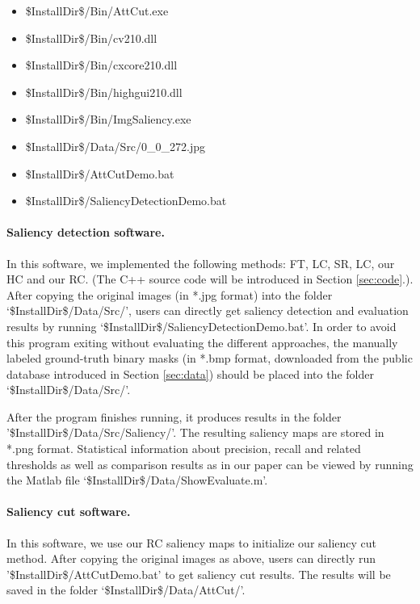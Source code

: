 \documentclass[10pt,twocolumn,letterpaper]{article}
\newcommand{\secref}[1]{Section \ref{#1}}
\newcommand{\SR}{SR\cite{07cvpr/hou_SpectralResidual}}
\newcommand{\FT}{FT\cite{09cvpr/Achanta_FTSaliency}}
\newcommand{\LC}{LC\cite{06acmmm/ZhaiS_spatiotemporal}}
\begin{document}
\begin{itemize}
  \item \$InstallDir\$/Bin/AttCut.exe
  \item \$InstallDir\$/Bin/cv210.dll
  \item \$InstallDir\$/Bin/cxcore210.dll
  \item \$InstallDir\$/Bin/highgui210.dll
  \item \$InstallDir\$/Bin/ImgSaliency.exe
  \item \$InstallDir\$/Data/Src/0\_0\_272.jpg
  \item \$InstallDir\$/AttCutDemo.bat
  \item \$InstallDir\$/SaliencyDetectionDemo.bat
\end{itemize}

\paragraph{Saliency detection software.} In this software,
we implemented the following methods: \FT, \LC, \SR, \LC, our HC and our RC.
(The C++ source code will be introduced in \secref{sec:code}.). After copying the original images (in *.jpg format) into the folder `\$InstallDir\$/Data/Src/', users can directly get saliency detection and evaluation results by running `\$InstallDir\$/SaliencyDetectionDemo.bat'.
In order to avoid this program exiting without evaluating the different approaches, the manually labeled ground-truth binary masks (in *.bmp format, downloaded from the public database introduced in \secref{sec:data}) should be placed into the folder `\$InstallDir\$/Data/Src/'.

After the program finishes running, it produces results in the folder '\$InstallDir\$/Data/Src/Saliency/'. The resulting saliency maps are stored in *.png format. Statistical information about precision, recall
and related thresholds as well as comparison results as in our paper can be viewed by running the Matlab file `\$InstallDir\$/Data/ShowEvaluate.m'.

\paragraph{Saliency cut software.} In this software, we use our RC saliency maps
to initialize our saliency cut method. After copying the original images as above, users can directly run '\$InstallDir\$/AttCutDemo.bat' to get saliency cut results. The
results will be saved in the folder `\$InstallDir\$/Data/AttCut/'.
\end{document}
